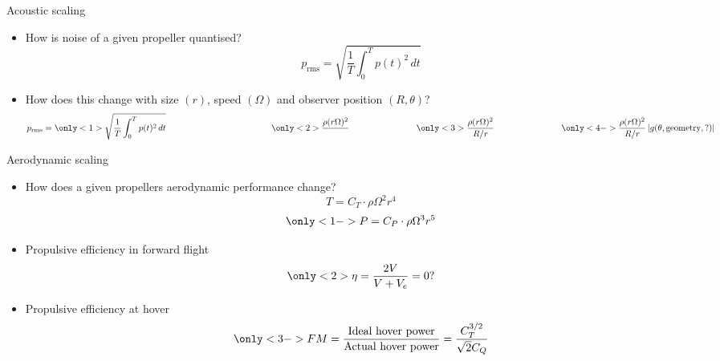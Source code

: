 \documentclass{beamer}
\begin{document}
\begin{frame}{Acoustic scaling}
    \begin{itemize}
        \item<1-> How is noise of a given propeller quantised?
        \[
            p_\text{rms} =  \sqrt{ \frac{1}{T} \int_0^T p(t)^2\, dt}
        \]
        \item<2-> How does this change with size $(r)$, speed $(\Omega)$ and observer position $(R,\theta)$?
        \[
        p_\text{rms} = 
        \only<1>{\sqrt{ \frac{1}{T} \int_0^T p(t)^2\, dt }
                \phantom{ = \frac{\rho(r \Omega)^2}{R/r} \left| g(\theta, \text{geometry}, ?) \right|}}
        \only<2>{\frac{\rho(r \Omega)^2}{\phantom{R/r}}
                \phantom{\left| g(\theta, \text{geometry}, ?) \right|}}
        \only<3>{\frac{\rho(r \Omega)^2}{R/r}
                \phantom{\left| g(\theta, \text{geometry}, ?) \right|}}
        \only<4->{\frac{\rho(r \Omega)^2}{R/r}
                \left| g(\theta, \text{geometry}, ?) \right|}
        \]
    \end{itemize}
\end{frame}


\begin{frame}{Aerodynamic scaling}
    \begin{itemize}
        
        \item How does a given propellers aerodynamic performance change?
        \[
            T = C_T \cdot \rho \Omega^2 r^4
        \]
        \[
            \only<1->{P = C_P \cdot \rho \Omega^3 r^5}
        \]
        \item<2> Propulsive efficiency in forward flight
        \[
            \only<2>{\eta = \frac{2 V}{V + V_e}} = 0?
        \]
        \vspace{-2.3cm}
        \item<3> Propulsive efficiency at hover
        \[
            \only<3->{FM = \frac{\text{Ideal hover power}}{\text{Actual hover power}} = \frac{C_T^{3/2}}{\sqrt{2}C_Q}}
        \]
        
    \end{itemize}
\end{frame}
\end{document}

